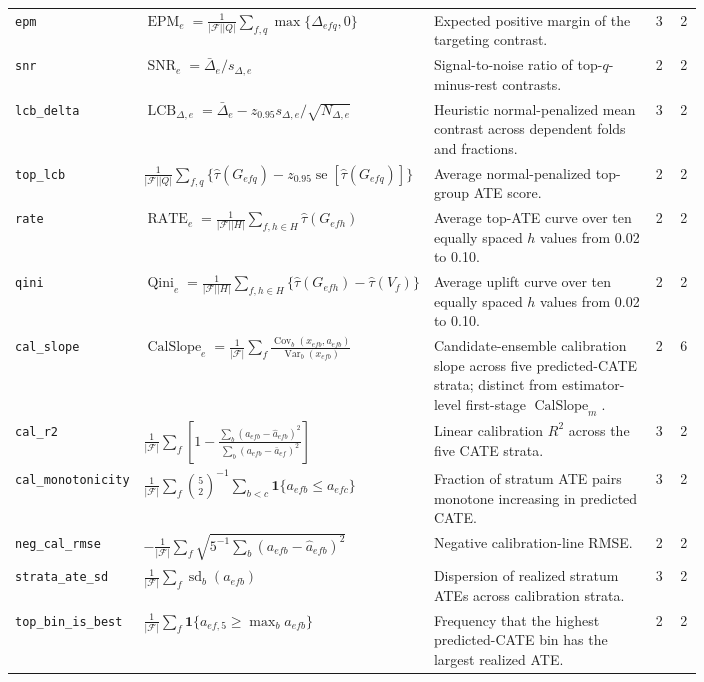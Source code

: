 \begin{landscape}
\begin{longtable}{@{}p{0.175\linewidth}p{0.30\linewidth}p{0.32\linewidth}cc@{}}
\texttt{epm} & \(\operatorname{EPM}_e=\frac{1}{|\mathcal F||Q|}\sum_{f,q}\max\{\Delta_{efq},0\}\) & Expected positive margin of the targeting contrast. & 3 & 2 \\
\texttt{snr} & \(\operatorname{SNR}_e=\bar\Delta_e/s_{\Delta,e}\) & Signal-to-noise ratio of top-\(q\)-minus-rest contrasts. & 2 & 2 \\
\texttt{lcb\_delta} & \(\operatorname{LCB}_{\Delta,e}=\bar\Delta_e-z_{0.95}s_{\Delta,e}/\sqrt{N_{\Delta,e}}\) & Heuristic normal-penalized mean contrast across dependent folds and fractions. & 3 & 2 \\
\texttt{top\_lcb} & \(\frac{1}{|\mathcal F||Q|}\sum_{f,q}\{\widehat\tau(G_{efq})-z_{0.95}\operatorname{se}[\widehat\tau(G_{efq})]\}\) & Average normal-penalized top-group ATE score. & 2 & 2 \\
\texttt{rate} & \(\operatorname{RATE}_e=\frac{1}{|\mathcal F||H|}\sum_{f,h\in H}\widehat\tau(G_{efh})\) & Average top-ATE curve over ten equally spaced \(h\) values from 0.02 to 0.10. & 2 & 2 \\
\texttt{qini} & \(\operatorname{Qini}_e=\frac{1}{|\mathcal F||H|}\sum_{f,h\in H}\{\widehat\tau(G_{efh})-\widehat\tau(V_f)\}\) & Average uplift curve over ten equally spaced \(h\) values from 0.02 to 0.10. & 2 & 2 \\
\texttt{cal\_slope} & \(\operatorname{CalSlope}_e=\frac{1}{|\mathcal F|}\sum_f\frac{\operatorname{Cov}_b(x_{efb},a_{efb})}{\operatorname{Var}_b(x_{efb})}\) & Candidate-ensemble calibration slope across five predicted-CATE strata; distinct from estimator-level first-stage $\operatorname{CalSlope}_m$. & 2 & 6 \\
\texttt{cal\_r2} & \(\frac{1}{|\mathcal F|}\sum_f\left[1-\frac{\sum_b(a_{efb}-\widehat a_{efb})^2}{\sum_b(a_{efb}-\bar a_{ef})^2}\right]\) & Linear calibration \(R^2\) across the five CATE strata. & 3 & 2 \\
\texttt{cal\_monotonicity} & \(\frac{1}{|\mathcal F|}\sum_f\binom{5}{2}^{-1}\sum_{b<c}\mathbf 1\{a_{efb}\le a_{efc}\}\) & Fraction of stratum ATE pairs monotone increasing in predicted CATE. & 3 & 2 \\
\texttt{neg\_cal\_rmse} & \(-\frac{1}{|\mathcal F|}\sum_f\sqrt{5^{-1}\sum_b(a_{efb}-\widehat a_{efb})^2}\) & Negative calibration-line RMSE. & 2 & 2 \\
\texttt{strata\_ate\_sd} & \(\frac{1}{|\mathcal F|}\sum_f\operatorname{sd}_b(a_{efb})\) & Dispersion of realized stratum ATEs across calibration strata. & 3 & 2 \\
\texttt{top\_bin\_is\_best} & \(\frac{1}{|\mathcal F|}\sum_f\mathbf 1\{a_{ef,5}\ge\max_b a_{efb}\}\) & Frequency that the highest predicted-CATE bin has the largest realized ATE. & 2 & 2 \\

\end{longtable}
\end{landscape}
